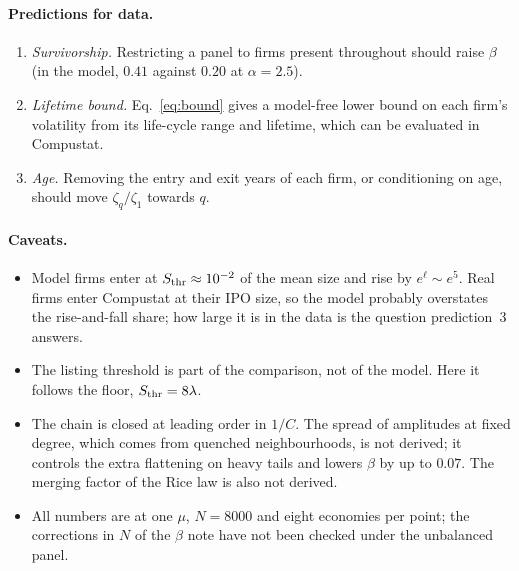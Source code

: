\documentclass[11pt]{article}
\newcommand{\Sthr}{S_{\rm thr}}
\theoremstyle{remark}
\begin{document}
\paragraph{Predictions for data.}
\begin{enumerate}
  \item \emph{Survivorship.} Restricting a panel to firms present throughout should raise $\beta$
        (in the model, $0.41$ against $0.20$ at $\alpha=2.5$).
  \item \emph{Lifetime bound.} Eq.~\eqref{eq:bound} gives a model-free lower bound on each firm's volatility
        from its life-cycle range and lifetime, which can be evaluated in Compustat.
  \item \emph{Age.} Removing the entry and exit years of each firm, or conditioning on age, should move
        $\zeta_q/\zeta_1$ towards $q$.
\end{enumerate}

\paragraph{Caveats.}
\begin{itemize}
  \item Model firms enter at $\Sthr\approx10^{-2}$ of the mean size and rise by $e^{\ell}\sim e^{5}$.  Real firms
        enter Compustat at their IPO size, so the model probably overstates the rise-and-fall share; how large it
        is in the data is the question prediction~3 answers.
  \item The listing threshold is part of the comparison, not of the model.  Here it follows the floor,
        $\Sthr=8\lambda$.
  \item The chain is closed at leading order in $1/C$.  The spread of amplitudes at fixed degree, which comes from
        quenched neighbourhoods, is not derived; it controls the extra flattening on heavy tails and lowers $\beta$ by
        up to $0.07$.  The merging factor of the Rice law is also not derived.
  \item All numbers are at one $\mu$, $N=8000$ and eight economies per point; the corrections in $N$ of the
        $\beta$ note have not been checked under the unbalanced panel.
\end{itemize}
\end{document}
